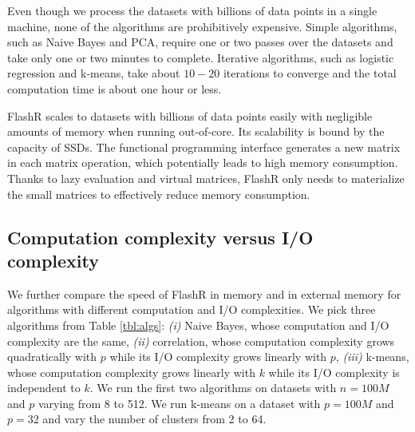 Even though we process the datasets with billions of data points in a single
machine, none of the algorithms are prohibitively expensive. Simple algorithms,
such as Naive Bayes and PCA, require one or two passes over the datasets and
take only one or two minutes to complete. Iterative
algorithms, such as logistic regression and k-means, take about $10-20$
iterations to converge and the total computation time is about one hour or
less.

FlashR scales to datasets with billions of data points easily with negligible
amounts of memory when running out-of-core.
Its scalability is bound by the capacity of SSDs. The functional programming
interface generates a new matrix in each matrix operation, which potentially
leads to high memory consumption. Thanks to lazy evaluation and virtual matrices,
FlashR only needs to materialize the small matrices to effectively reduce
memory consumption.

\subsection{Computation complexity versus I/O complexity}
We further compare the speed of FlashR in memory and in external memory
for algorithms with different computation and I/O complexities.
We pick three algorithms from Table \ref{tbl:algs}: \textit{(i)} Naive Bayes,
whose computation and I/O complexity are the same, \textit{(ii)}
correlation, whose computation complexity grows quadratically with $p$ while
its I/O complexity grows linearly with $p$, \textit{(iii)} k-means, whose computation
complexity grows linearly with $k$ while its I/O complexity is independent
to $k$. We run the first two algorithms on datasets with $n=100M$ and $p$
varying from 8 to 512. We run k-means on a dataset with $p=100M$ and $p=32$
and vary the number of clusters from 2 to 64.

